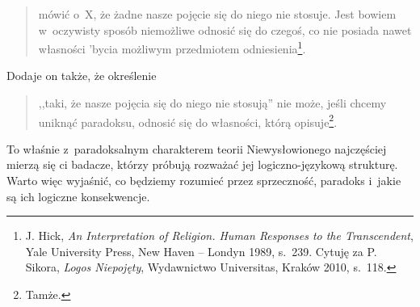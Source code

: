 \begin{quote}
mówić o~X, że żadne nasze pojęcie się do niego nie stosuje. Jest bowiem w~oczywisty sposób niemożliwe odnosić się do czegoś, co nie posiada nawet własności 'bycia możliwym przedmiotem odniesienia\footnote{J. Hick, \textit{An Interpretation of Religion. Human Responses to the Transcendent}, Yale University Press, New Haven -- Londyn 1989, s.~239. Cytuję za P. Sikora, \textit{Logos Niepojęty}, Wydawnictwo Universitas, Kraków 2010, s.~118.}.

\end{quote}
Dodaje on także, że określenie

\begin{quote}
,,taki, że nasze pojęcia się do niego nie stosują'' nie może, jeśli chcemy uniknąć paradoksu, odnosić się do własności, którą opisuje\footnote{Tamże.}.
\end{quote}

To właśnie z~paradoksalnym charakterem teorii Niewysłowionego najczęściej mierzą się ci badacze, którzy próbują rozważać jej logiczno-językową strukturę. Warto więc wyjaśnić, co będziemy rozumieć przez sprzeczność, paradoks i~jakie są ich logiczne konsekwencje.


